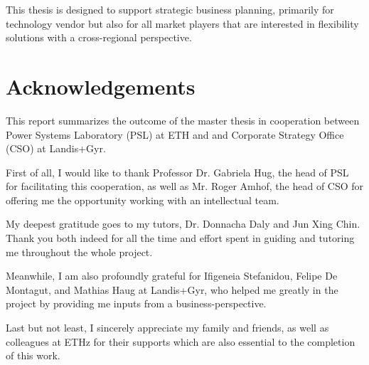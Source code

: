 \documentclass[a4paper,11pt,twoside,onecolumn]{book}
\begin{document}
This thesis is designed to support strategic business planning, primarily for technology vendor but also for all market players that are interested in flexibility solutions with a cross-regional perspective.


\newpage


\chapter*{Acknowledgements}
%
This report summarizes the outcome of the master thesis in cooperation between Power Systems Laboratory (PSL) at ETH and and Corporate Strategy Office (CSO) at Landis+Gyr. 

First of all, I would like to thank Professor Dr. Gabriela Hug, the head of PSL for facilitating this cooperation, as well as Mr. Roger Amhof, the head of CSO for offering me the opportunity working with an intellectual team.   

My deepest gratitude goes to my tutors, Dr. Donnacha Daly and Jun Xing Chin. Thank you both indeed for all the time and effort spent in guiding and tutoring me throughout the whole project. 

Meanwhile, I am also profoundly grateful for Ifigeneia Stefanidou, Felipe De Montagut, and Mathias Haug at Landis+Gyr, who helped me greatly in the project by providing me inputs from a business-perspective. 

Last but not least, I sincerely appreciate my family and friends, as well as colleagues at ETHz for their supports which are also essential to the completion of this work.

\newpage

\tableofcontents
\newpage


\newpage



\mainmatter













\appendix
%




\backmatter



\end{document}
